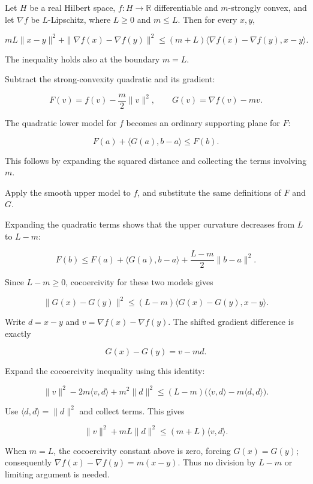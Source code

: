 \documentclass[11pt,a4paper]{report}
\begin{document}
Let \(H\) be a real Hilbert space, \(f:H\to\mathbb R\) differentiable and \(m\)-strongly convex, and let \(\nabla f\) be \(L\)-Lipschitz, where \(L\ge0\) and \(m\le L\). Then for every \(x,y\),

\[mL\|x-y\|^2+\|\nabla f(x)-\nabla f(y)\|^2\le(m+L)\langle\nabla f(x)-\nabla f(y),x-y\rangle.\]

The inequality holds also at the boundary \(m=L\).



Subtract the strong-convexity quadratic and its gradient:

\[F(v)=f(v)-\frac m2\|v\|^2,\qquad G(v)=\nabla f(v)-mv.\]

The quadratic lower model for \(f\) becomes an ordinary supporting plane for \(F\):

\[F(a)+\langle G(a),b-a\rangle\le F(b).\]

This follows by expanding the squared distance and collecting the terms involving \(m\).



Apply the smooth upper model to \(f\), and substitute the same definitions of \(F\) and \(G\).



Expanding the quadratic terms shows that the upper curvature decreases from \(L\) to \(L-m\):

\[F(b)\le F(a)+\langle G(a),b-a\rangle+\frac{L-m}{2}\|b-a\|^2.\]

Since \(L-m\ge0\), cocoercivity for these two models gives

\[\|G(x)-G(y)\|^2\le(L-m)\langle G(x)-G(y),x-y\rangle.\]

Write \(d=x-y\) and \(v=\nabla f(x)-\nabla f(y)\). The shifted gradient difference is exactly

\[G(x)-G(y)=v-md.\]

Expand the cocoercivity inequality using this identity:

\[\|v\|^2-2m\langle v,d\rangle+m^2\|d\|^2\le(L-m)\bigl(\langle v,d\rangle-m\langle d,d\rangle\bigr).\]

Use \(\langle d,d\rangle=\|d\|^2\) and collect terms. This gives

\[\|v\|^2+mL\|d\|^2\le(m+L)\langle v,d\rangle.\]

When \(m=L\), the cocoercivity constant above is zero, forcing \(G(x)=G(y)\); consequently \(\nabla f(x)-\nabla f(y)=m(x-y)\). Thus no division by \(L-m\) or limiting argument is needed.
\end{document}

